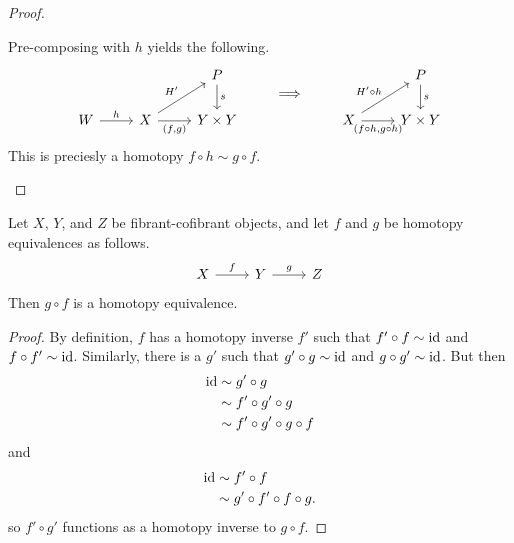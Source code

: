 \documentclass[main.tex]{subfiles}
\begin{document}
\begin{proof}
\begin{enumerate}
      Pre-composing with $h$ yields the following.
      \begin{equation*}
        \begin{tikzcd}
          && P
          \arrow[d, "s"]
          \\
          W
          \arrow[r, "h"]
          & X
          \arrow[r, swap, "{(f, g)}"]
          \arrow[ur, "H'"]
          & Y \times Y
        \end{tikzcd}
        \qquad\implies\qquad
        \begin{tikzcd}
          & P
          \arrow[d, "s"]
          \\
          X
          \arrow[r, swap, "{(f \circ h, g \circ h)}"]
          \arrow[ur, "H' \circ h"]
          & Y \times Y
        \end{tikzcd}
      \end{equation*}
      This is preciesly a homotopy $f \circ h \sim g \circ f$.
  \end{enumerate}
\end{proof}

\begin{corollary}
  \label{cor:composition_of_homotopy_equivalences_is_homotopy_equivalence}
  Let $X$, $Y$, and $Z$ be fibrant-cofibrant objects, and let $f$ and $g$ be homotopy equivalences as follows.
  \begin{equation*}
    \begin{tikzcd}
      X
      \arrow[r, "f"]
      & Y
      \arrow[r, "g"]
      & Z
    \end{tikzcd}
  \end{equation*}
  Then $g \circ f$ is a homotopy equivalence.
\end{corollary}
\begin{proof}
  By definition, $f$ has a homotopy inverse $f'$ such that $f' \circ f \sim \mathrm{id}$ and $f \circ f' \sim \mathrm{id}$. Similarly, there is a $g'$ such that $g' \circ g \sim \mathrm{id}$ and $g \circ g' \sim \mathrm{id}$. But then
  \begin{align*}
    \mathrm{id} &\sim g' \circ g \\
    &\sim f' \circ g' \circ g \\
    &\sim f' \circ g' \circ g \circ f
  \end{align*}
  and
  \begin{align*}
    \mathrm{id} &\sim f' \circ f \\
    &\sim g' \circ f' \circ f \circ g.
  \end{align*}
  so $f' \circ g'$ functions as a homotopy inverse to $g \circ f$.
\end{proof}
\end{document}
